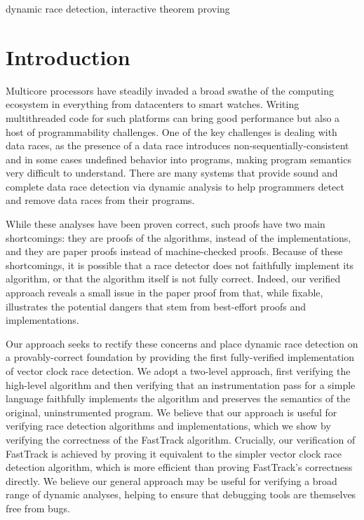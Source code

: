 \documentclass[preprint, 10pt]{sigplanconf}
\begin{document}
\keywords
dynamic race detection, interactive theorem proving

\section{Introduction}

Multicore processors have steadily invaded a broad swathe of the computing ecosystem in everything from datacenters to smart watches. Writing multithreaded code for such platforms can bring good performance but also a host of programmability challenges. One of the key challenges is dealing with data races, as the presence of a data race introduces non-sequentially-consistent \cite{manson_java_2005} and in some cases undefined \cite{boehm_foundations_2008} behavior into programs, making program semantics very difficult to understand. There are many systems that provide sound and complete data race detection via dynamic analysis \cite{djit+,fasttrack,slimstate} to help programmers detect and remove data races from their programs. 

While these analyses have been proven correct, such proofs have two main shortcomings: they are proofs of the algorithms, instead of the implementations, and they are paper proofs instead of machine-checked proofs. Because of these shortcomings, it is possible that a race detector does not faithfully implement its algorithm, or that the algorithm itself is not fully correct. Indeed, our verified approach reveals a small issue in the paper proof from \cite{fasttrack} that, while fixable, illustrates the potential dangers that stem from best-effort proofs and implementations.

Our approach seeks to rectify these concerns and place dynamic race detection on a provably-correct foundation by providing the first fully-verified implementation of vector clock race detection. We adopt a two-level approach, first verifying the high-level algorithm and then verifying that an instrumentation pass for a simple language faithfully implements the algorithm and preserves the semantics of the original, uninstrumented program. We believe that our approach is useful for verifying race detection algorithms and implementations, which we show by verifying the correctness of the FastTrack \cite{fasttrack} algorithm. Crucially, our verification of FastTrack is achieved by proving it equivalent to the simpler vector clock race detection algorithm, which is more efficient than proving FastTrack's correctness directly. We believe our general approach may be useful for verifying a broad range of dynamic analyses, helping to ensure that debugging tools are themselves free from bugs.
\end{document}
